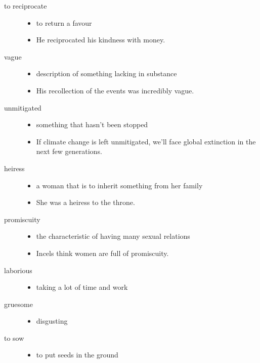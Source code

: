 \documentclass[a4paper]{article}
\begin{document}
\begin{description}
\begin{itemize}
    \end{itemize}
    \item[to reciprocate] \begin{itemize}
        \item to return a favour
        \item He reciprocated his kindness with money.
    \end{itemize}
    \item[vague] \begin{itemize}
        \item description of something lacking in substance
        \item His recollection of the events was incredibly vague.
    \end{itemize}
    \item[unmitigated] \begin{itemize}
        \item something that hasn't been stopped
        \item If climate change is left unmitigated, we'll face global extinction in the next few generations.
    \end{itemize}
    \item[heiress] \begin{itemize}
        \item a woman that is to inherit something from her family
        \item She was a heiress to the throne.
    \end{itemize}
    \item[promiscuity] \begin{itemize}
        \item the characteristic of having many sexual relations
        \item Incels think women are full of promiscuity.
    \end{itemize}
    \item[laborious] \begin{itemize}
        \item taking a lot of time and work
    \end{itemize}
    \item[gruesome] \begin{itemize}
        \item disgusting
    \end{itemize}
    \item[to sow] \begin{itemize}
        \item to put seeds in the ground

\end{itemize}
\end{description}
\end{document}
